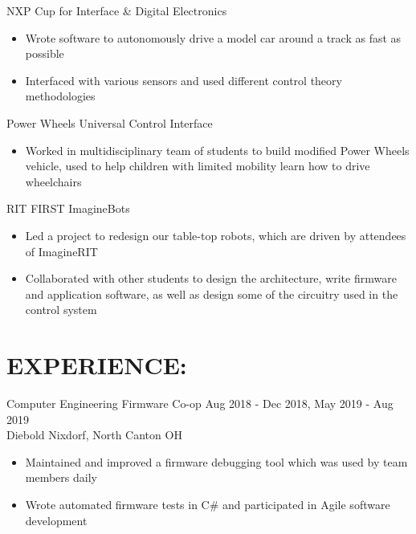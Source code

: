 \documentclass[line,margin]{res}
\begin{document}
\begin{resume}

		NXP Cup for Interface \& Digital Electronics
		\begin{itemize}
			\item Wrote software to autonomously drive a model car around a track as fast as possible
			\item Interfaced with various sensors and used different control theory methodologies
		\end{itemize}
		\vspace{-10pt}

		Power Wheels Universal Control Interface
		\begin{itemize}
			\item Worked in multidisciplinary team of students to build modified Power Wheels vehicle, used to help children with limited mobility learn how to drive wheelchairs
		\end{itemize}
		\vspace{-10pt}

		RIT FIRST ImagineBots
		\begin{itemize}
			\item Led a project to redesign our table-top robots, which are driven by attendees of ImagineRIT 
			\item Collaborated with other students to design the architecture, write firmware and application software, as well as design some of the circuitry used in the control system
		\end{itemize}

	\section{EXPERIENCE:}

		Computer Engineering Firmware Co-op \hfill Aug 2018 - Dec 2018, May 2019 - Aug 2019\\
		Diebold Nixdorf, North Canton OH
		\begin{itemize}
			\item Maintained and improved a firmware debugging tool which was used by team members daily
			\item Wrote automated firmware tests in C\# and participated in Agile software development
		\end{itemize}
		\vspace{-8pt}


\end{resume}
\end{document}
